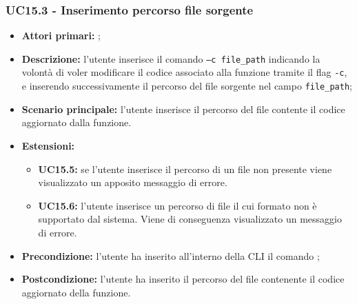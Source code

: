 \subsubsection{UC15.3 - Inserimento percorso file sorgente}
\begin{itemize}
	\item \textbf{Attori primari:} \us{};
	\item \textbf{Descrizione:} l'utente inserisce il comando \pedit{} \texttt{–c file\_path} indicando la volontà di voler modificare il codice associato alla funzione tramite il flag \texttt{-c}, e inserendo successivamente il percorso del file sorgente nel campo \texttt{file\_path}; 
	\item \textbf{Scenario principale:} l'utente inserisce il percorso del file contente il codice aggiornato dalla funzione. 
	\item \textbf{Estensioni:} 
	\begin{itemize}
		\item \textbf{UC15.5:} se l'utente inserisce il percorso di un file non presente viene visualizzato un apposito messaggio di errore.
		\item \textbf{UC15.6:} l’utente inserisce un percorso di file il cui formato non è supportato dal sistema. Viene di conseguenza visualizzato un messaggio di errore.
	\end{itemize}
	\item \textbf{Precondizione:} l’utente ha inserito all’interno della CLI il comando \edit{}; 
	\item \textbf{Postcondizione:} l’utente ha inserito il percorso del file contenente il codice aggiornato della funzione.
\end{itemize}